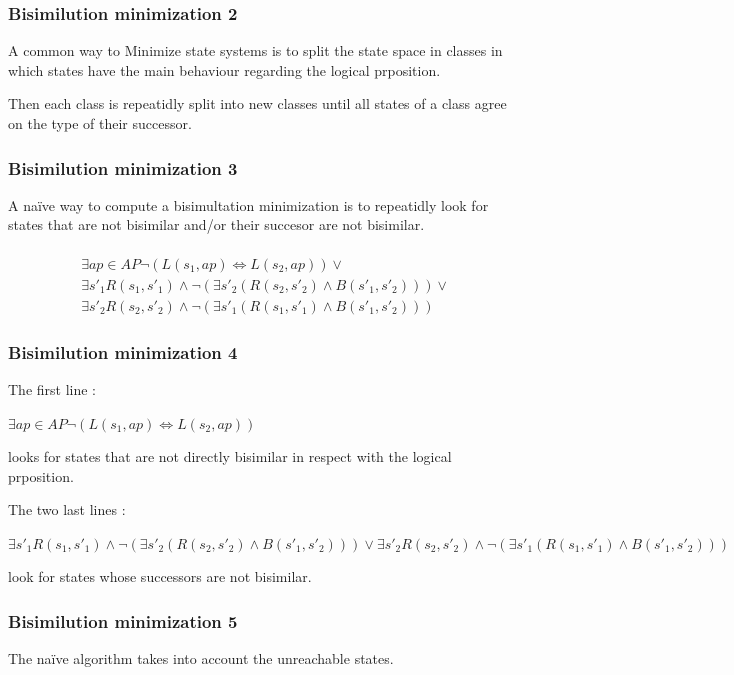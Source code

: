\documentclass[11pt,handout]{beamer}
\begin{document}
\begin{frame}
 \frametitle{Bisimilution minimization 2}
 A common way to Minimize state systems is to split the state space in classes in which states have
 the main behaviour regarding the logical prposition.
 
 Then each class is repeatidly split into new classes until all states of a class agree on the type of their successor.
\end{frame}

\begin{frame}
 \frametitle{Bisimilution minimization 3}
 A naïve way to compute a bisimultation minimization is to repeatidly look for states that are not bisimilar and/or their succesor are not bisimilar.\\\\
 \vspace{10pt}
 \begin{align*}
   & \exists ap \in AP \lnot (L(s_1, ap) \Leftrightarrow L(s_2, ap)) \lor \\
   & \exists s'_1 R(s_1, s'_1) \land \lnot (\exists s'_2 (R(s_2, s'_2) \land B(s'_1, s'_2))) \lor \\
   & \exists s'_2 R(s_2, s'_2) \land \lnot (\exists s'_1 (R(s_1, s'_1) \land B(s'_1, s'_2)))
 \end{align*}
\end{frame}

\begin{frame}
 \frametitle{Bisimilution minimization 4}
 The first line : \vspace{10pt}
 
  $\exists ap \in AP \lnot (L(s_1, ap) \Leftrightarrow L(s_2, ap))$ \vspace{10pt}
  
  looks for states that are not directly bisimilar in respect with the logical prposition.
  
  The two last lines : \vspace{10pt}
  
  $\exists s'_1 R(s_1, s'_1) \land \lnot (\exists s'_2 (R(s_2, s'_2) \land B(s'_1, s'_2))) \lor
  
  \exists s'_2 R(s_2, s'_2) \land \lnot (\exists s'_1 (R(s_1, s'_1) \land B(s'_1, s'_2)))$ \vspace{10pt}
  
  look for states whose successors are not bisimilar.
\end{frame}

\begin{frame}
 \frametitle{Bisimilution minimization 5}
 The naïve algorithm takes into account the unreachable states.
\end{frame}
\end{document}
